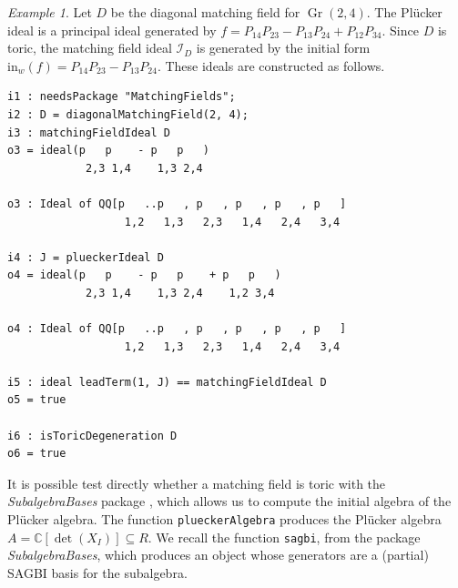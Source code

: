 \documentclass[11pt]{article}
\newcommand{\CC}{\mathbb C}
\newcommand{\MI}{\mathcal I}
\newcommand{\init}{\text{in}}
\DeclareMathOperator{\Gr}{Gr}
\theoremstyle{plain}
\theoremstyle{definition}
\theoremstyle{remark}
\newtheorem{example}[theorem]{Example}
\begin{document}
\begin{example}\label{example: gr24 diag mf ideal}
   Let $D$ be the diagonal matching field for $\Gr(2,4)$. The Pl\"ucker ideal is a principal ideal generated by $f = P_{14} P_{23} - P_{13}P_{24} + P_{12}P_{34}$. Since $D$ is toric, the matching field ideal $\MI_D$ is generated by the initial form $\init_w(f) = P_{14}P_{23}-P_{13}P_{24}$. These ideals are constructed as follows.

\begin{lstlisting}[caption = {Matching field ideals}]
i1 : needsPackage "MatchingFields";
i2 : D = diagonalMatchingField(2, 4);
i3 : matchingFieldIdeal D
o3 = ideal(p   p    - p   p   )
            2,3 1,4    1,3 2,4

o3 : Ideal of QQ[p   ..p   , p   , p   , p   , p   ]
                  1,2   1,3   2,3   1,4   2,4   3,4

i4 : J = plueckerIdeal D
o4 = ideal(p   p    - p   p    + p   p   )
            2,3 1,4    1,3 2,4    1,2 3,4

o4 : Ideal of QQ[p   ..p   , p   , p   , p   , p   ]
                  1,2   1,3   2,3   1,4   2,4   3,4

i5 : ideal leadTerm(1, J) == matchingFieldIdeal D
o5 = true

i6 : isToricDegeneration D
o6 = true
\end{lstlisting}

\end{example}

It is possible test directly whether a matching field is toric with the \textit{SubalgebraBases} package \cite{burr2023subalgebrabases}, which allows us to compute the initial algebra of the Pl\"ucker algebra. The function \texttt{plueckerAlgebra} produces the Pl\"ucker algebra $A = \CC[\det(X_I)] \subseteq R$. We recall the function \texttt{sagbi}, from the package \textit{SubalgebraBases}, which produces an object whose generators are a (partial) SAGBI basis for the subalgebra. 
\end{document}
